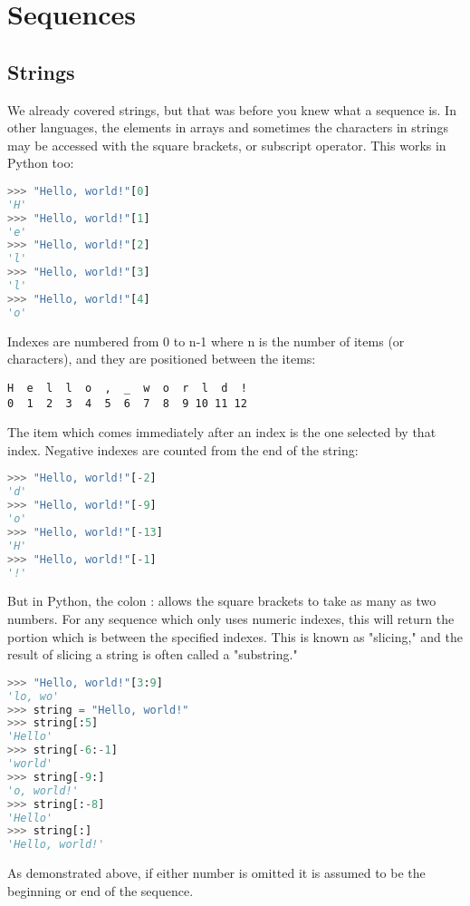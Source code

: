 \section{Sequences}
\subsection{Strings}
We already covered strings, but that was before you knew what a sequence is. In
other languages, the elements in arrays and sometimes the characters in strings
may be accessed with the square brackets, or subscript operator. This works in
Python too:
\lstset{basicstyle=\scriptsize, numbers=left, captionpos=b, tabsize=4}
\begin{lstlisting}[caption=String Char Sequence 1,language={Python},
xleftmargin=15pt, label=lst:stringcharsequence1]
>>> "Hello, world!"[0]
'H'
>>> "Hello, world!"[1]
'e'
>>> "Hello, world!"[2]
'l'
>>> "Hello, world!"[3]
'l'
>>> "Hello, world!"[4]
'o'
\end{lstlisting}

Indexes are numbered from 0 to n-1 where n is the number of items (or
characters), and they are positioned between the items:
\scriptsize
\begin{verbatim}
H  e  l  l  o  ,  _  w  o  r  l  d  !
0  1  2  3  4  5  6  7  8  9 10 11 12
\end{verbatim}
\normalsize

The item which comes immediately after an index is the one selected by that
index. Negative indexes are counted from the end of the string:
\lstset{basicstyle=\scriptsize, numbers=left, captionpos=b, tabsize=4}
\begin{lstlisting}[caption=String Char Sequence 2,language={Python},
xleftmargin=15pt, label=lst:stringcharsequence2]
>>> "Hello, world!"[-2]
'd'
>>> "Hello, world!"[-9]
'o'
>>> "Hello, world!"[-13]
'H'
>>> "Hello, world!"[-1]
'!'
\end{lstlisting}

But in Python, the colon : allows the square brackets to take as many as two
numbers. For any sequence which only uses numeric indexes, this will return the
portion which is between the specified indexes. This is known as "slicing," and
the result of slicing a string is often called a "substring."
\lstset{basicstyle=\scriptsize, numbers=left, captionpos=b, tabsize=4}
\begin{lstlisting}[caption=Slice Operation 1,language={Python},
xleftmargin=15pt, label=lst:sliceoperation1]
>>> "Hello, world!"[3:9]
'lo, wo'
>>> string = "Hello, world!"
>>> string[:5]
'Hello'
>>> string[-6:-1]
'world'
>>> string[-9:]
'o, world!'
>>> string[:-8]
'Hello'
>>> string[:]
'Hello, world!'
\end{lstlisting}
As demonstrated above, if either number is omitted it is assumed to be the beginning or end of the sequence.


